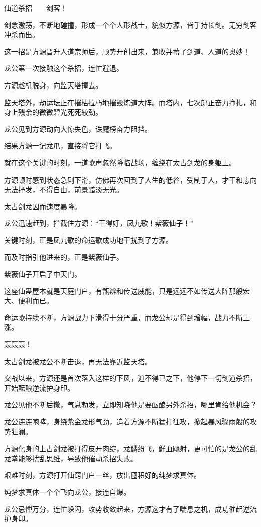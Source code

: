 \begin{this_body}
仙道杀招——剑客！

剑念激荡，不断地碰撞，形成一个个人形战士，貌似方源，皆手持长剑。无穷剑客冲杀而出。

这一招是方源晋升人道宗师后，顺势开创出来，兼收并蓄了剑道、人道的奥妙！

龙公第一次接触这个杀招，连忙避退。

方源趁机脱身，向监天塔撞去。

监天塔外，劫运坛正在摧枯拉朽地摧毁炼道大阵。而塔内，七次郎正奋力挣扎，和身上残余的微微碧光死死较劲。

龙公见到方源动向大惊失色，诛魔榜奋力阻挡。

结果方源一记龙爪，直接将它打飞。

就在这个关键的时刻，一道歌声忽然降临战场，缠绕在太古剑龙的身躯上。

方源顿时感到状态急剧下滑，仿佛再次回到了人生的低谷，受制于人，才干和志向无法抒发，不得自由，前景黯淡无光。

太古剑龙因而速度暴降。

龙公迅速赶到，拦截住方源：“干得好，凤九歌！紫薇仙子！”

关键时刻，正是凤九歌的命运歌成功地干扰到了方源。

而及时指引他进来的，正是紫薇仙子。

紫薇仙子开启了中天门。

这座仙蛊屋本就是天庭门户，有甑辨和传送威能，只是远远不如传送大阵那般宏大、便利而已。

命运歌持续不断，方源战力下滑得十分严重，而龙公却是得到增幅，战力不断上涨。

轰轰轰！

太古剑龙被龙公不断击退，再无法靠近监天塔。

交战以来，方源还是首次落入这样的下风，迫不得已之下，他停下一切剑道杀招，开始酝酿逆流护身印。

龙公见他不断后撤，气息勃发，立即知晓他是要酝酿另外杀招，哪里肯给他机会？

龙公连连咆哮，身绕紫金龙形气劲，追着方源不断猛打狂攻，掀起暴风骤雨般的攻势狂澜。

方源化身的上古剑龙被打得皮开肉绽，龙鳞纷飞，鲜血飚射，更可怕的是龙公的乱龙拳能够扰乱思维，导致他催动杀招失败。

艰难时刻，方源打开仙窍门户一丝，放出囤积好的纯梦求真体。

纯梦求真体一个个飞向龙公，接连自爆。

龙公忌惮万分，连忙躲闪，攻势收敛起来，方源这才有了喘息之机，成功催起逆流护身印。


\end{this_body}
